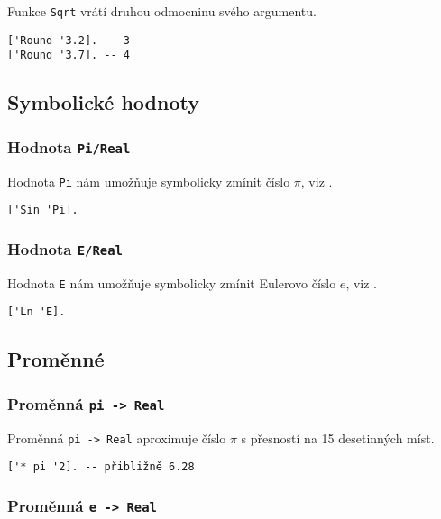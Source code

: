 Funkce \lstinline{Sqrt} vrátí druhou odmocninu svého argumentu.

\begin{lstlisting}[caption={Ukázka využití Round}]
['Round '3.2]. -- 3
['Round '3.7]. -- 4
\end{lstlisting}

\subsection{Symbolické hodnoty}

\subsubsection*{Hodnota \lstinline{Pi/Real}}

Hodnota \lstinline{Pi} nám umožňuje symbolicky zmínit číslo $\pi$, viz .

\begin{lstlisting}[caption={Ukázka využití Pi}]
['Sin 'Pi].
\end{lstlisting}

\subsubsection*{Hodnota \lstinline{E/Real}}

Hodnota \lstinline{E} nám umožňuje symbolicky zmínit Eulerovo číslo $e$,
viz .

\begin{lstlisting}[caption={Ukázka využití E}]
['Ln 'E].
\end{lstlisting}

\subsection{Proměnné}

\subsubsection*{Proměnná \lstinline{pi -> Real}}

Proměnná \lstinline{pi -> Real} aproximuje číslo $\pi$ s přesností na 15 desetinných míst.

\begin{lstlisting}[caption={Ukázka využití proměnné pi}]
['* pi '2]. -- přibližně 6.28
\end{lstlisting}

\subsubsection*{Proměnná \lstinline{e -> Real}}

